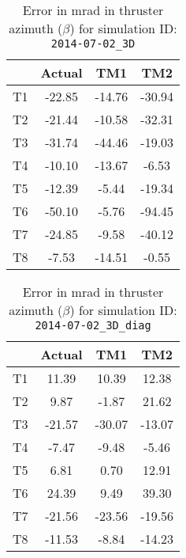 \begin{table}[H]
\centering
\cprotect\caption{Error in mrad in thruster azimuth ($\beta$) for simulation ID:\\
\verb|2014-07-02_3D|}
\begin{tabular}{|c|c|c|c|} \hline
~ & Actual & TM1 & TM2 \\ \hline
T1 & -22.85 & -14.76 & -30.94 \\
T2 & -21.44 & -10.58 & -32.31 \\
T3 & -31.74 & -44.46 & -19.03 \\
T4 & -10.10 & -13.67 & -6.53 \\
T5 & -12.39 & -5.44 & -19.34 \\
T6 & -50.10 & -5.76 & -94.45 \\
T7 & -24.85 & -9.58 & -40.12 \\
T8 & -7.53 & -14.51 & -0.55 \\ \hline
\end{tabular}
\label{beta-5}
\end{table}

\begin{table}[H]
\centering
\cprotect\caption{Error in mrad in thruster azimuth ($\beta$) for simulation ID:\\
\verb|2014-07-02_3D_diag|}
\begin{tabular}{|c|c|c|c|} \hline
~ & Actual & TM1 & TM2 \\ \hline
T1 & 11.39 & 10.39 & 12.38 \\
T2 & 9.87 & -1.87 & 21.62 \\
T3 & -21.57 & -30.07 & -13.07 \\
T4 & -7.47 & -9.48 & -5.46 \\
T5 & 6.81 & 0.70 & 12.91 \\
T6 & 24.39 & 9.49 & 39.30 \\
T7 & -21.56 & -23.56 & -19.56 \\
T8 & -11.53 & -8.84 & -14.23 \\ \hline
\end{tabular}
\label{beta-6}
\end{table}
